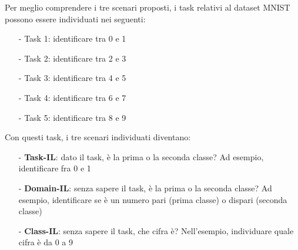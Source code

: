 Per meglio comprendere i tre scenari proposti, i task relativi al dataset MNIST possono essere individuati nei seguenti:
\begin{itemize}
    \item[-] Task 1: identificare tra 0 e 1
    \item[-] Task 2: identificare tra 2 e 3
    \item[-] Task 3: identificare tra 4 e 5
    \item[-] Task 4: identificare tra 6 e 7
    \item[-] Task 5: identificare tra 8 e 9
\end{itemize}
Con questi task, i tre scenari individuati diventano:
\begin{itemize}
    \item[-] \textbf{Task-IL}: dato il task, è la prima o la seconda classe? Ad esempio, identificare fra 0 e 1
    \item[-] \textbf{Domain-IL}: senza sapere il task, è la prima o la seconda classe? Ad esempio, identificare se è un numero pari (prima classe) o dispari (seconda classe)
    \item[-] \textbf{Class-IL}: senza sapere il task, che cifra è? Nell'esempio, individuare quale cifra è da 0 a 9
\end{itemize}
